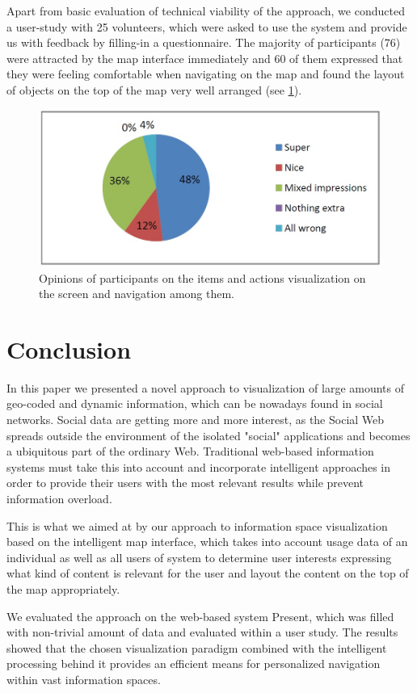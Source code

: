 \documentclass[6pt]{article}
\begin{document}
Apart from basic evaluation of technical viability of the approach, we conducted a user-study with 25 volunteers, which were asked to use the system and provide us with feedback by filling-in a questionnaire. The majority of participants (76) were attracted by the map interface immediately and 60 of them expressed that they were feeling comfortable when navigating on the map and found the layout of objects on the top of the map very well arranged (see \ref{fig4}).
\begin{figure}[ht]
\includegraphics[width=\textwidth]{images/fig5.jpg}
\caption{Opinions of participants on the items and actions visualization on the screen and navigation among them.}
\label{fig4}
\end{figure}

\section{Conclusion}
In this paper we presented a novel approach to visualization of large amounts of geo-coded and dynamic information, which can be nowadays found in social networks. Social data are getting more and more interest, as the Social Web spreads outside the environment of the isolated "social" applications and becomes a ubiquitous part of the ordinary Web. Traditional web-based information systems must take this into account and incorporate intelligent approaches in order to provide their users with the most relevant results while prevent information overload.

This is what we aimed at by our approach to information space visualization based on the intelligent map interface, which takes into account usage data of an individual as well as all users of system to determine user interests expressing what kind of content is relevant for the user and layout the content on the top of the map appropriately.

We evaluated the approach on the web-based system Present, which was filled with non-trivial amount of data and evaluated within a user study. The results showed that the chosen visualization paradigm combined with the intelligent processing behind it provides an efficient means for personalized navigation within vast information spaces.
\end{document}
